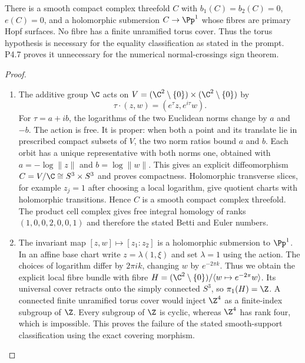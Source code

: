 \begin{proposition}[P4.11]\hypertarget{tag-02WI}{}\label{night:P4.11}\label{stmt:P4.11}

There is a smooth compact complex threefold $C$ with
$b_1(C)=b_2(C)=0$, $e(C)=0$, and a holomorphic submersion
$C\to\Pp^1$ whose fibres are primary Hopf surfaces. No fibre has
a finite unramified torus cover. Thus the torus hypothesis is
necessary for the equality classification as stated in the prompt.
P4.7 proves it unnecessary for the numerical normal-crossings
sign theorem.
\end{proposition}
\begin{proof}

\begin{enumerate}[label={$\langle1\rangle$\arabic*.},leftmargin=*]
\item The additive group $\C$ acts on
$V=(\C^2\setminus\{0\})\times(\C^2\setminus\{0\})$ by
\[
 \tau\cdot(z,w)=(e^\tau z,e^{i\tau}w).
\]
For $\tau=a+ib$, the logarithms of the two Euclidean norms change
by $a$ and $-b$. The action is free. It is proper: when both a
point and its translate lie in prescribed compact subsets of $V$,
the two norm ratios bound $a$ and $b$. Each orbit has a unique
representative with both norms one, obtained with
$a=-\log\|z\|$ and $b=\log\|w\|$. This gives an explicit
diffeomorphism $C=V/\C\cong S^3\times S^3$ and proves compactness.
Holomorphic transverse slices, for example $z_j=1$ after choosing
a local logarithm, give quotient charts with holomorphic
transitions. Hence $C$ is a smooth compact complex threefold.
The product cell complex gives free integral homology of ranks
$(1,0,0,2,0,0,1)$ and therefore the stated Betti and Euler numbers.

\item The invariant map $[z,w]\mapsto[z_1:z_2]$ is a holomorphic
submersion to $\Pp^1$. In an affine base chart write
$z=\lambda(1,\xi)$ and set $\lambda=1$ using the action.
The choices of logarithm differ by $2\pi ik$, changing $w$ by
$e^{-2\pi k}$. Thus we obtain the explicit local fibre bundle
with fibre
$H=(\C^2\setminus\{0\})/\langle w\mapsto e^{-2\pi}w\rangle$.
Its universal cover retracts onto the simply connected $S^3$, so
$\pi_1(H)=\Z$. A connected finite unramified torus cover would
inject $\Z^4$ as a finite-index subgroup of $\Z$. Every subgroup
of $\Z$ is cyclic, whereas $\Z^4$ has rank four, which is
impossible. This proves the failure of the stated smooth-support
classification using the exact covering morphism.

\end{enumerate}
\end{proof}